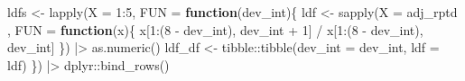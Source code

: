 \documentclass[
  letterpaper,
  DIV=11,
  numbers=noendperiod]{scrartcl}
\newenvironment{Shaded}{\begin{snugshade}}{\end{snugshade}}
\newcommand{\AttributeTok}[1]{\textcolor[rgb]{0.40,0.45,0.13}{#1}}
\newcommand{\ControlFlowTok}[1]{\textcolor[rgb]{0.00,0.23,0.31}{\textbf{#1}}}
\newcommand{\DecValTok}[1]{\textcolor[rgb]{0.68,0.00,0.00}{#1}}
\newcommand{\FunctionTok}[1]{\textcolor[rgb]{0.28,0.35,0.67}{#1}}
\newcommand{\NormalTok}[1]{\textcolor[rgb]{0.00,0.23,0.31}{#1}}
\newcommand{\OtherTok}[1]{\textcolor[rgb]{0.00,0.23,0.31}{#1}}
\newcommand{\SpecialCharTok}[1]{\textcolor[rgb]{0.37,0.37,0.37}{#1}}
\begin{document}
\begin{Shaded}
\begin{Highlighting}[]
\NormalTok{ldfs }\OtherTok{\textless{}{-}} \FunctionTok{lapply}\NormalTok{(}\AttributeTok{X =} \DecValTok{1}\SpecialCharTok{:}\DecValTok{5}\NormalTok{, }\AttributeTok{FUN =} \ControlFlowTok{function}\NormalTok{(dev\_int)\{}
\NormalTok{  ldf }\OtherTok{\textless{}{-}} \FunctionTok{sapply}\NormalTok{(}\AttributeTok{X =}\NormalTok{ adj\_rptd , }\AttributeTok{FUN =} \ControlFlowTok{function}\NormalTok{(x)\{}
\NormalTok{    x[}\DecValTok{1}\SpecialCharTok{:}\NormalTok{(}\DecValTok{8} \SpecialCharTok{{-}}\NormalTok{ dev\_int), dev\_int }\SpecialCharTok{+} \DecValTok{1}\NormalTok{] }\SpecialCharTok{/}\NormalTok{ x[}\DecValTok{1}\SpecialCharTok{:}\NormalTok{(}\DecValTok{8} \SpecialCharTok{{-}}\NormalTok{ dev\_int), dev\_int]}
\NormalTok{  \}) }\SpecialCharTok{|\textgreater{}} \FunctionTok{as.numeric}\NormalTok{()}
\NormalTok{  ldf\_df }\OtherTok{\textless{}{-}}\NormalTok{ tibble}\SpecialCharTok{::}\FunctionTok{tibble}\NormalTok{(}\AttributeTok{dev\_int =}\NormalTok{ dev\_int, }\AttributeTok{ldf =}\NormalTok{ ldf)}
\NormalTok{\}) }\SpecialCharTok{|\textgreater{}}\NormalTok{ dplyr}\SpecialCharTok{::}\FunctionTok{bind\_rows}\NormalTok{()}


\end{Highlighting}
\end{Shaded}
\end{document}
